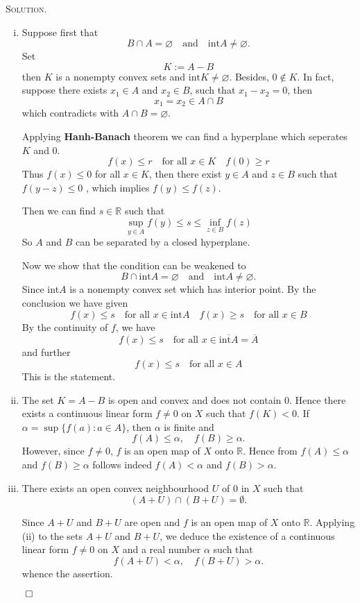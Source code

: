 \documentclass[12pt, a4paper, oneside]{ctexart}
\newenvironment{solution}{%
	\par\noindent\textsc{Solution. }\ignorespaces
}{%
	\hfill$\qed$\par
}
\begin{document}
	\begin{solution}
		\begin{enumerate}[(i)]
			\item Suppose first that \[ B\cap A = \varnothing \quad \text{and} \quad \text{int} A \neq \varnothing.\]
			Set \[ K := A - B \] then $K$ is a nonempty convex sets and $\text{int}K \neq\varnothing$. Besides, $0\notin K$. In fact, suppose there exists $x_{1}\in A$ and $x_{2}\in B$, such that $x_{1} - x_{2} = 0$, then \[ x_{1} = x_{2}\in A\cap B \] which contradicts with $A\cap B = \varnothing$.
			
			Applying \textbf{Hanh-Banach} theorem we can find a hyperplane which seperates $K$ and $0$.\[ f(x)\leq r\quad\text{for all }x\in K\quad f(0)\geq r \] Thus $f(x)\leq 0$ for all $x\in K$, then there exist $y\in A$ and $z\in B$ such that $f(y-z)\leq0$ , which implies $f(y)\leq f(z)$. 
			
			Then we can find $s\in \mathbb{R}$ such that\[ \sup_{y\in A}f(y) \leq s \leq \inf_{z\in B}f(z) \]So $A$ and $B$ can be separated by a closed hyperplane.
			
			Now we show that the condition can be weakened to \[
			B \cap \text{int} A = \varnothing \quad \text{and} \quad \text{int} A \neq \varnothing.
			\]
			Since int$A$ is a nonempty convex set which has interior point. By the conclusion we have given \[ f(x)\leq s\quad\text{for all }x\in \text{int}A \quad f(x)\geq s\quad\text{for all }x\in B\]By the continuity of $f$, we have \[ f(x)\leq s\quad\text{for all }x\in \overline{\text{int}A} = \overline{A} \] and further\[ f(x)\leq s\quad\text{for all }x\in A \]This is the statement.
			
			\item The set \( K = A - B \) is open and convex and does not contain \( 0 \).  
			Hence  there exists a continuous linear form \( f \neq 0 \) on \( X \) such that \( f(K) < 0 \).  
			If \( \alpha = \sup \{f(a): a \in A\} \), then \( \alpha \) is finite and  
			\[
			f(A) \leq \alpha, \quad f(B) \geq \alpha.
			\]  
			However, since \( f \neq 0 \), \( f \) is an open map of \( X \) onto \( \mathbb{R} \).  
			Hence from \( f(A) \leq \alpha \) and \( f(B) \geq \alpha \) follows indeed \( f(A) < \alpha \) and \( f(B) > \alpha \).
			
			\item There exists an open convex neighbourhood \( U \) of \( 0 \) in \( X \) such that  
			\[
			(A + U) \cap (B + U) = \emptyset.
			\]  
			
			Since $A + U$  and \( B + U \) are open and \( f \) is an open map of \( X \) onto \( \mathbb{R} \). Applying (ii) to the sets \( A + U \) and \( B + U \), we deduce the existence of a continuous linear form \( f \neq 0 \) on \( X \) and a real number \( \alpha \) such that  
			\[
			f(A + U) < \alpha, \quad f(B + U) > \alpha.
			\]  
			whence the assertion.
		\end{enumerate}
		
	\end{solution}
	
\end{document}
